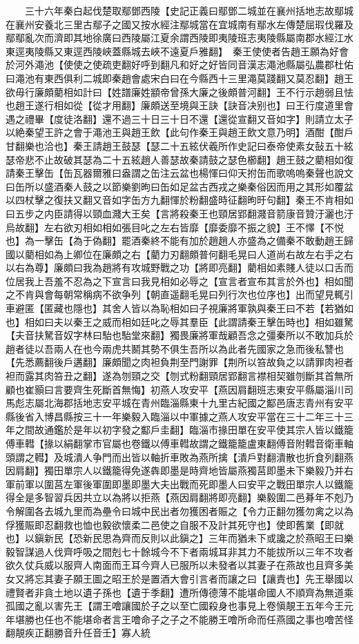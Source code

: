　　三十六年秦白起伐楚取鄢鄧西陵【史記正義曰鄢鄧二城並在襄州括地志故鄢城在襄州安養北三里古鄢子之國又按水經注鄢城當在宜城南有鄢水左傳楚屈瑕伐羅及鄢鄢亂次而濟即其地徐廣曰西陵屬江夏余謂西陵即夷陵班志夷陵縣屬南郡水經江水東逕夷陵縣又東逕西陵峽蓋縣城去峽不遠夏戶雅翻】　秦王使使者告趙王願為好會於河外澠池【使使之使疏吏翻好呼到翻凡和好之好皆同音漢志澠池縣屬弘農郡杜佑曰澠池有東西俱利二城即秦趙會處宋白曰在今縣西十三里澠莫踐翻又莫忍翻】趙王欲毋行廉頗藺相如計曰【姓譜廉姓顓帝曾孫大廉之後頗普河翻】王不行示趙弱且怯也趙王遂行相如從【從才用翻】廉頗送至境與王訣【訣音决别也】曰王行度道里會遇之禮畢【度徒洛翻】還不過三十日三十日不還【還從宣翻又音如字】則請立太子以絶秦望王許之會于澠池王與趙王飲【此句作秦王與趙王飲文意乃明】酒酣【酣戶甘翻樂也洽也】秦王請趙王鼓瑟【瑟二十五絃伏羲所作史記曰泰帝使素女鼔五十絃瑟帝悲不止故破其瑟為二十五絃趙人善瑟故秦請鼓之瑟色櫛翻】趙王鼓之藺相如復請秦王擊缶【缶瓦器爾雅曰盎謂之缶注云盆也楊惲曰仰天拊缶而歌嗚嗚秦聲也說文曰缶所以盛酒秦人鼓之以節樂劉昫曰缶如足盆古西戎之樂秦俗因而用之其形如覆盆以四杖擊之復扶又翻又音如字缶方九翻惲於粉翻盛時征翻昫旴句翻】秦王不肯相如曰五步之内臣請得以頸血濺大王矣【言將殺秦王也頸居郢翻濺音箭康音贊汙灑也汙烏故翻】左右欲刃相如相如張目叱之左右皆靡【靡委靡不振之貌】王不懌【不悦也】為一擊缶【為于偽翻】罷酒秦終不能有加於趙趙人亦盛為之備秦不敢動趙王歸國以藺相如為上卿位在廉頗之右【藺力刃翻頗普何翻毛晃曰人道尚右故左右手之右以右為尊】廉頗曰我為趙將有攻城野戰之功【將即亮翻】藺相如素賤人徒以口舌而位居我上吾羞不忍為之下宣言曰我見相如必辱之【宣言者宣布其言於外也】相如聞之不肯與會每朝常稱病不欲争列【朝直遥翻毛晃曰列行次也位序也】出而望見輒引車避匿【匿藏也隱也】其舍人皆以為恥相如曰子視廉將軍孰與秦王曰不若【若猶如也】相如曰夫以秦王之威而相如廷叱之辱其羣臣【此謂請秦王擊缶時也】相如雖駑【夫音扶駑音奴字林曰駘也駘堂來翻】獨畏廉將軍哉顧吾念之彊秦所以不敢加兵於趙者徒以吾兩人在也今兩虎共鬭其勢不俱生吾所以為此者先國家之急而後私讐也【先悉薦翻後戶遘翻】廉頗聞之肉袒負荆至門謝罪【荆所以笞故負之以請罪肉袒者袒而露其肉笞丑之翻】遂為刎頸之交【刎式粉翻頸居郢翻言襟相契雖刎斷其首無所顧也崔顥曰言要齊生死斷首無悔】初燕人攻安平【燕因肩翻班志東安平縣屬淄川司馬彪志屬北海郡括地志安平城在青州臨淄縣東十九里古紀國之酅邑唐志青州有安平縣後省入博昌縣按三十一年樂毅入臨淄以中軍據之燕人攻安平當在三十二年三十三年之間故通鑑於是年以初字發之酅戶圭翻】臨淄市掾田單在安平使其宗人皆以鐵籠傅車轊【掾以絹翻掌市官屬也卷鐵以傅車轊故謂之鐵籠籠盧東翻傅音附轊音衛車軸頭謂之轊】及城潰人争門而出皆以軸折車敗為燕所擒【潰戶對翻潰散也折食列翻燕因肩翻】獨田單宗人以鐵籠得免遂犇即墨是時齊地皆屬燕獨莒即墨未下樂毅乃并右軍前軍以圍莒左軍後軍圍即墨即墨大夫出戰而死即墨人曰安平之戰田單宗人以鐵籠得全是多智習兵因共立以為將以拒燕【燕因肩翻將即亮翻】樂毅圍二邑朞年不剋乃令解圍各去城九里而為壘令曰城中民出者勿獲困者賑之【令力正翻勿獲勿禽之以為俘獲賑即忍翻救也恤也毅欲懷柔二邑使之自服不及計其死守也】使即舊業【即就也】以鎭新民【恐新民思為齊而反則以此鎭之】三年而猶未下或讒之於燕昭王曰樂毅智謀過人伐齊呼吸之間剋七十餘城今不下者兩城耳非其力不能拔所以三年不攻者欲久仗兵威以服齊人南面而王耳今齊人已服所以未發者以其妻子在燕故也且齊多美女又將忘其妻子願王圖之昭王於是置酒大會引言者而讓之曰【讓責也】先王舉國以禮賢者非貪土地以遺子孫也【遺于季翻】遭所傳德薄不能堪命國人不順齊為無道乘孤國之亂以害先王【謂王噲讓國於子之以至亡國殺身也事見上卷愼靚王五年今王元年堪勝也任也不能堪命者言王噲命子之子之不能勝王噲所命而任燕國之事也噲苦怪翻靚疾正翻勝音升任音壬】寡人統